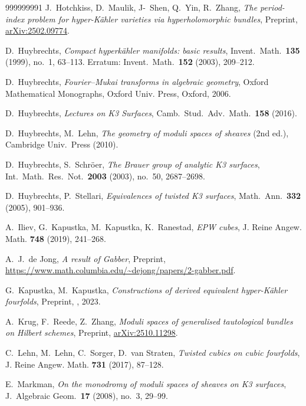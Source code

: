 \documentclass[12pt,a4paper]{amsart}
\theoremstyle{plain}
\theoremstyle{definition}
\theoremstyle{remark}
\begin{document}
\begin{thebibliography}{999999991}
J.~Hotchkiss, D.~Maulik, J-~Shen, Q.~Yin, R.~Zhang,
\textit{The period-index problem for hyper-K\"ahler varieties via hyperholomorphic bundles},
Preprint, \href{https://arxiv.org/pdf/2502.09774}{arXiv:2502.09774}.

D.~Huybrechts,
\textit{Compact hyperk\"ahler manifolds: basic results},
Invent.\ Math.\ \textbf{135} (1999), no.~1, 63--113.
Erratum: Invent.\ Math.\ \textbf{152} (2003), 209--212.

D.~Huybrechts,
\textit{Fourier--Mukai transforms in algebraic geometry},
Oxford Mathematical Monographs, Oxford Univ. Press, Oxford, 2006.


D.~Huybrechts,
\textit{Lectures on K3 Surfaces}, Camb.\ Stud.\ Adv.\ Math.\ \textbf{158} (2016).

D.~Huybrechts, M.~Lehn,
\textit{The geometry of moduli spaces of sheaves} (2nd ed.),
Cambridge Univ.\ Press (2010).

D.~Huybrechts, S.~Schr\"oer,
\textit{The Brauer group of analytic K3 surfaces},
Int.\ Math.\ Res.\ Not.\ \textbf{2003} (2003), no.~50, 2687--2698.

D.~Huybrechts, P.~Stellari,
\textit{Equivalences of twisted K3 surfaces},
Math.\ Ann.\ \textbf{332} (2005), 901--936.

A.~Iliev, G.~Kapustka, M.~Kapustka, K.~Ranestad,
\textit{EPW cubes},
J. Reine Angew. Math. \textbf{748} (2019), 241--268.

A.~J.~de Jong,
\textit{A result of Gabber},
Preprint,  \url{https://www.math.columbia.edu/~dejong/papers/2-gabber.pdf}.

G.~Kapustka, M.~Kapustka,
\textit{Constructions of derived equivalent hyper-K\"ahler fourfolds},
Preprint, \href{https://arxiv.org/abs/2312.14543}, 2023.

A.~Krug, F.~Reede, Z.~Zhang,
\textit{Moduli spaces of generalised tautological bundles on Hilbert schemes},
Preprint, \href{https://arxiv.org/abs/2510.11298}{arXiv:2510.11298}.

C.~Lehn, M.~Lehn, C.~Sorger, D.~van Straten,
\textit{Twisted cubics on cubic fourfolds},
J. Reine Angew. Math. \textbf{731} (2017), 87--128.

E.~Markman,
\textit{On the monodromy of moduli spaces of sheaves on K3 surfaces},
J.\ Algebraic Geom.\ \textbf{17} (2008), no.~3, 29--99.


\end{thebibliography}
\end{document}
